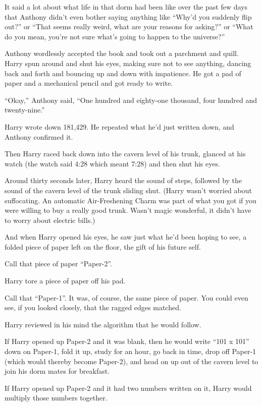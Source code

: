 It said a lot about what life in that dorm had been like over the past
few days that Anthony didn't even bother saying anything like ``Why'd
you suddenly flip out?'' or ``That seems really weird, what are your
reasons for asking?'' or ``What do you mean, you're not sure what's
going to happen to the universe?''

Anthony wordlessly accepted the book and took out a parchment and quill.
Harry spun around and shut his eyes, making sure not to see anything,
dancing back and forth and bouncing up and down with impatience. He got
a pad of paper and a mechanical pencil and got ready to write.

``Okay,'' Anthony said, ``One hundred and eighty-one thousand, four
hundred and twenty-nine.''

Harry wrote down 181,429. He repeated what he'd just written down, and
Anthony confirmed it.

Then Harry raced back down into the cavern level of his trunk, glanced
at his watch (the watch said 4:28 which meant 7:28) and then shut his
eyes.

Around thirty seconds later, Harry heard the sound of steps, followed by
the sound of the cavern level of the trunk sliding shut. (Harry wasn't
worried about suffocating. An automatic Air-Freshening Charm was part of
what you got if you were willing to buy a really good trunk. Wasn't
magic wonderful, it didn't have to worry about electric bills.)

And when Harry opened his eyes, he saw just what he'd been hoping to
see, a folded piece of paper left on the floor, the gift of his future
self.

Call that piece of paper ``Paper-2''.

Harry tore a piece of paper off his pad.

Call that ``Paper-1''. It was, of course, the same piece of paper. You
could even see, if you looked closely, that the ragged edges matched.

Harry reviewed in his mind the algorithm that he would follow.

If Harry opened up Paper-2 and it was blank, then he would write ``101 x
101'' down on Paper-1, fold it up, study for an hour, go back in time,
drop off Paper-1 (which would thereby become Paper-2), and head on up
out of the cavern level to join his dorm mates for breakfast.

If Harry opened up Paper-2 and it had two numbers written on it, Harry
would multiply those numbers together.

